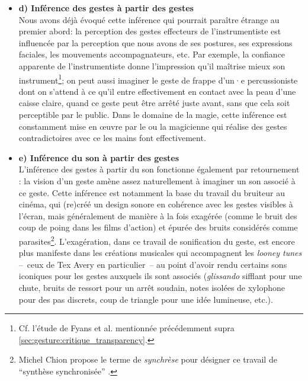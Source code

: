 \begin{itemize}[noitemsep]
	\item \textbf{d) Inférence des gestes à partir des gestes}\\
	Nous avons déjà évoqué cette inférence qui pourrait paraître étrange au premier abord: la perception des gestes effecteurs de l'instrumentiste est influencée par la perception que nous avons de ses postures, ses expressions faciales, les mouvements accompagnateurs, etc. Par exemple, la confiance apparente de l'instrumentiste donne l'impression qu'il maîtrise mieux son instrument\footnote{Cf. l'étude de Fyans et al. mentionnée précédemment supra \ref{sec:gesture:critique_transparency}.}; on peut aussi imaginer le geste de frappe d'un·e percussioniste dont on s'attend à ce qu'il entre effectivement en contact avec la peau d'une caisse claire, quand ce geste peut être arrêté juste avant, sans que cela soit perceptible par le public. Dans le domaine de la magie, cette inférence est constamment mise en œuvre par le ou la magicienne qui réalise des gestes contradictoires avec ce les mains font effectivement.

	\item \textbf{e) Inférence du son à partir des gestes}\\
	L'inférence des gestes à partir du son fonctionne également par retournement : la vision d'un geste amène assez naturellement à imaginer un son associé à ce geste. Cette inférence est notamment la base du travail du bruiteur au cinéma, qui (re)créé un design sonore en cohérence avec les gestes visibles à l'écran, mais généralement de manière à la fois exagérée (comme le bruit des coup de poing dans les films d'action) et épurée des bruits considérés comme parasites\footnote{Michel Chion propose le terme de \textit{synchrèse} pour désigner ce travail de ``synthèse synchronisée'' \cite{chion_audio-vision:_2013}.}. L'exagération, dans ce travail de sonification du geste, est encore plus manifeste dans les créations musicales qui accompagnent les \textit{looney tunes} --~ceux de Tex Avery en particulier~-- au point d'avoir rendu certains sons iconiques pour les gestes auxquels ils sont associés (\textit{glissando} sifflant pour une chute, bruits de ressort pour un arrêt soudain, notes isolées de xylophone pour des pas discrets, coup de triangle pour une idée lumineuse, etc.).


\end{itemize}
